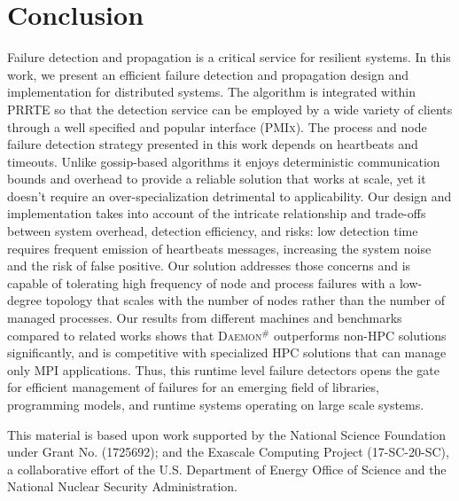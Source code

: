 \documentclass[sigconf]{acmart}
\newcommand{\prrte}[0]{\textsc{PRRTE}\xspace}
\newcommand{\pmix}[0]{\textsc{PMIx}\xspace}
\newcommand{\mpi}[0]{\textsc{MPI}\xspace}
\newcommand{\ourwork}[0]{\textsc{Daemon}\ensuremath{^\#}\xspace}
\begin{document}
\section{Conclusion}\label{sec:conclusion}
Failure detection and propagation is a critical service for resilient systems. In this work, we present an efficient failure detection and propagation design and implementation for distributed systems. 
The algorithm is integrated within \prrte so that the detection service 
can be employed by a wide variety of clients through a well specified and 
popular interface (\pmix). The process and node failure detection strategy presented in this work depends on heartbeats and timeouts. Unlike gossip-based algorithms
it enjoys deterministic communication bounds and overhead to provide a reliable solution that works at scale,
yet it doesn't require an over-specialization detrimental to applicability. 
Our design and implementation takes into account of the intricate relationship and trade-offs between system overhead, detection efficiency, and risks: low detection time requires frequent emission of heartbeats messages, increasing the system noise and the risk of false positive. Our solution addresses those concerns and is capable of tolerating high frequency of node and process failures with a low-degree
topology that scales with the number of nodes rather than the number of 
managed processes. Our results from different machines and benchmarks 
compared to related works shows that \ourwork outperforms non-HPC solutions 
significantly, and is competitive with specialized HPC solutions that can 
manage only \mpi applications. Thus, this runtime level failure detectors 
opens the gate for efficient management of failures for an emerging field 
of libraries, programming models, and runtime systems operating on large scale systems.  


%
\begin{acks}
This material is based upon work supported by the National Science Foundation under Grant No. (1725692); and the Exascale Computing Project (17-SC-20-SC), a collaborative effort of the 
U.S. Department of Energy Office of Science and the National Nuclear Security Administration.    
\end{acks}

%


\end{document}
